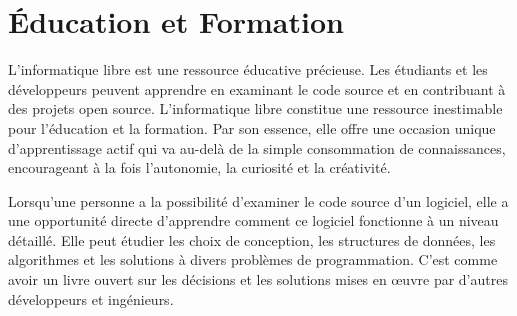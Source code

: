 



\section{Éducation et Formation}
L'informatique libre est une ressource éducative précieuse. Les étudiants et les développeurs peuvent apprendre en examinant le code source et en contribuant à des projets open source.
L'informatique libre constitue une ressource inestimable pour l'éducation et la formation. Par son essence, elle offre une occasion unique d'apprentissage actif qui va au-delà de la simple consommation de connaissances, encourageant à la fois l'autonomie, la curiosité et la créativité.

Lorsqu'une personne a la possibilité d'examiner le code source d'un logiciel, elle a une opportunité directe d'apprendre comment ce logiciel fonctionne à un niveau détaillé. Elle peut étudier les choix de conception, les structures de données, les algorithmes et les solutions à divers problèmes de programmation. C'est comme avoir un livre ouvert sur les décisions et les solutions mises en œuvre par d'autres développeurs et ingénieurs.

